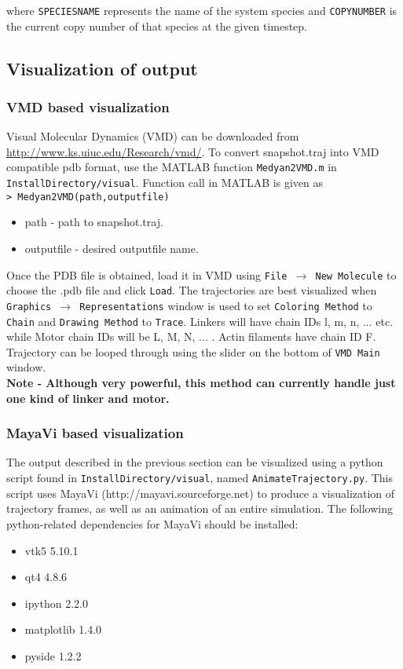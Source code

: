 \documentclass[11pt, oneside]{article}   	%
\begin{document}
\noindent where \texttt{SPECIESNAME} represents the name of the system species and \texttt{COPYNUMBER} is the current copy number of that species at the given timestep.

\subsection{Visualization of output}
\subsubsection{VMD based visualization}
Visual Molecular Dynamics (VMD) can be downloaded from \url{http://www.ks.uiuc.edu/Research/vmd/}. To convert snapshot.traj into VMD compatible pdb format, use the MATLAB function \texttt{Medyan2VMD.m} in \texttt{InstallDirectory/visual}.
Function call in MATLAB is given as \\ \newline
\texttt{> Medyan2VMD(path,outputfile)}
\begin{itemize}
\item path - path to snapshot.traj.
\item outputfile - desired outputfile name.
\end{itemize}

\noindent Once the PDB file is obtained, load it in VMD using \texttt{File $\rightarrow$ New Molecule} to choose the  .pdb file and click \texttt{Load}. 
The trajectories are best visualized when \texttt{Graphics $\rightarrow$ Representations} window is used to set \texttt{Coloring Method} to \texttt{Chain} and \texttt{Drawing Method} to \texttt{Trace}. Linkers will have chain IDs l, m, n, ... etc. while Motor chain IDs will be L, M, N, ... . Actin filaments have chain ID F.  Trajectory can be looped through using the slider on the bottom of \texttt{VMD Main} window. \\ \newline
\textbf{Note -  Although very powerful, this method can currently handle just one kind of linker and motor.}

\subsubsection{MayaVi based visualization}
The output described in the previous section can be visualized using a python script found in \texttt{InstallDirectory/visual}, named \texttt{AnimateTrajectory.py}. This script uses MayaVi (http://mayavi.sourceforge.net) to produce a visualization of trajectory frames, as well as an animation of an entire simulation.
The following python-related dependencies for MayaVi should be installed:
\begin{itemize}
\item vtk5 5.10.1
\item qt4 4.8.6
\item ipython 2.2.0
\item matplotlib 1.4.0
\item pyside 1.2.2
\end{itemize}
\end{document}
